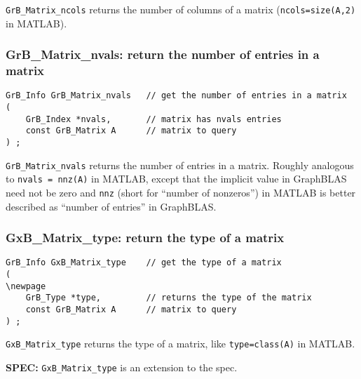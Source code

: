 \documentclass[12pt]{article}
\begin{document}
\verb'GrB_Matrix_ncols' returns the number of columns of a matrix
(\verb'ncols=size(A,2)' in MATLAB).

\newpage
\subsubsection{{\sf GrB\_Matrix\_nvals:}        return the number of entries in a matrix}
\label{matrix_nvals}

\begin{mdframed}[userdefinedwidth=6in]
{\footnotesize
\begin{verbatim}
GrB_Info GrB_Matrix_nvals   // get the number of entries in a matrix
(
    GrB_Index *nvals,       // matrix has nvals entries
    const GrB_Matrix A      // matrix to query
) ;
\end{verbatim} } \end{mdframed}

\verb'GrB_Matrix_nvals' returns the number of entries in a matrix.  Roughly
analogous to \verb'nvals = nnz(A)' in MATLAB, except that the implicit value in
GraphBLAS need not be zero and \verb'nnz' (short for ``number of nonzeros'') in
MATLAB is better described as ``number of entries'' in GraphBLAS.

\subsubsection{{\sf GxB\_Matrix\_type:}         return the type of a matrix}
\label{matrix_type}

\begin{mdframed}[userdefinedwidth=6in]
{\footnotesize
\begin{verbatim}
GrB_Info GxB_Matrix_type    // get the type of a matrix
(
\newpage
    GrB_Type *type,         // returns the type of the matrix
    const GrB_Matrix A      // matrix to query
) ;
\end{verbatim} } \end{mdframed}

\verb'GxB_Matrix_type' returns the type of a matrix, like \verb'type=class(A)'
in MATLAB.

\begin{spec}
{\bf SPEC:} \verb'GxB_Matrix_type' is an extension to the spec.
\end{spec}
\end{document}
